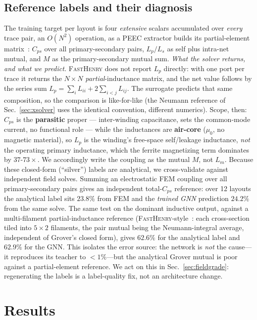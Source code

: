 \documentclass[letterpaper,twocolumn,9pt]{extarticle}
\begin{document}
\subsection{Reference labels and their diagnosis}
The training target per layout is four \emph{extensive} scalars accumulated over
\emph{every} trace pair, an $O(N^2)$ operation, as a PEEC extractor builds its
partial-element matrix~\cite{ruehli}: $C_{ps}$ over all primary-secondary pairs,
$L_p/L_s$ as self plus intra-net mutual, and $M$ as the primary-secondary
mutual sum. \emph{What the solver returns, and what we predict.} \textsc{FastHenry}
does not report $L_p$ directly: with one port per trace it returns the
$N\!\times\!N$ \emph{partial}-inductance matrix, and the net value follows by the
series sum $L_p=\sum_i L_{ii}+2\sum_{i<j}L_{ij}$. The surrogate predicts that same
composition, so the comparison is like-for-like (the Neumann reference of
Sec.~\ref{sec:xsolver} uses the identical convention, different numerics). Scope,
then: $C_{ps}$ is the \textbf{parasitic} proper --- inter-winding capacitance,
sets the common-mode current, no functional role --- while the inductances are
\textbf{air-core} ($\mu_0$, no magnetic material), so $L_p$ is the winding's
free-space self/leakage inductance, \emph{not} the operating primary inductance,
which the ferrite magnetizing term dominates by $37$-$73\times$. We accordingly
write the coupling as the mutual $M$, not $L_m$. Because
these closed-form (``silver'') labels are analytical, we
cross-validate against independent field solves. Summing an electrostatic FEM
coupling over all primary-secondary pairs gives an independent total-$C_{ps}$
reference: over 12 layouts the analytical label sits $23.8\%$ from FEM and the
\emph{trained GNN} prediction $24.2\%$ from the same solve. The same test on the
dominant inductive output, against a multi-filament partial-inductance reference
(\textsc{FastHenry}-style~\cite{fasthenry}: each cross-section tiled into
$5\!\times\!2$ filaments, the pair mutual being the Neumann-integral average,
independent of Grover's closed form), gives $62.6\%$ for the analytical label and
$62.9\%$ for the GNN. This isolates the error source: the network is \emph{not}
the cause---it reproduces its teacher to $<\!1\%$---but the analytical Grover
mutual is poor against a partial-element reference. We act on this in
Sec.~\ref{sec:fieldgrade}: regenerating the labels is a label-quality fix, not an
architecture change.

\section{Results}
\end{document}
